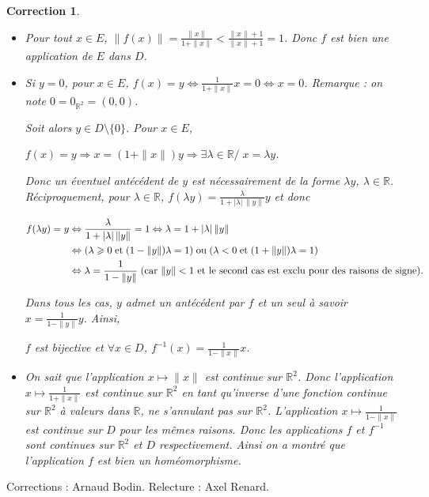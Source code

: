 \documentclass[11pt,a4paper]{article}
\newcommand{\Rr}{\mathbb{R}} \newcommand{\R}{\mathbb{R}}
\renewcommand{\ge}{\geqslant} \renewcommand{\geq}{\geqslant}
\theoremstyle{exostyle}
\newtheorem{cor}{Correction}
\newcommand{\correction}{\begin{cor}} \newcommand{\fincorrection}{\end{cor}}
\begin{document}
\correction
~
\begin{itemize}
  \item Pour tout $x\in E$, $\|f(x)\|= \frac{\|x\|}{1+\|x\|}< \frac{\|x\|+1}{\|x\|+1}=1$. Donc $f$ est bien une application de $E$ dans $D$.

  \item Si $y=0$, pour $x\in E$, $f(x)=y\Leftrightarrow \frac{1}{1+\|x\|}x=0\Leftrightarrow x=0$. Remarque : on note $0 = 0_{\Rr^2} = (0,0)$.

Soit alors $y\in D\setminus\{0\}$. Pour $x\in E$,

\begin{center}
	$f(x)=y\Rightarrow x=(1+\|x\|)y\Rightarrow\exists\lambda\in\Rr/\;x=\lambda y$.
\end{center}

Donc un éventuel antécédent de $y$ est nécessairement de la forme $\lambda y$, $\lambda\in\Rr$. Réciproquement, pour $\lambda\in\Rr$, $f(\lambda y)= \frac{\lambda}{1+|\lambda| \, \|y\|}y$ et donc

\begin{align*}\ensuremath
	f(\lambda y)=y&\Leftrightarrow \frac{\lambda}{1+|\lambda| \, \|y\|}=1\Leftrightarrow\lambda=1+|\lambda| \, \|y\|\\
	&\Leftrightarrow(\lambda\ge0\;\text{et}\;(1-\|y\|)\lambda=1)\;\text{ou}\;(\lambda<0\;\text{et}\;(1+\|y\|)\lambda=1)\\
	&\Leftrightarrow\lambda= \frac{1}{1-\|y\|}\;\text{(car $\|y\|<1$ et le second cas est exclu pour des raisons de signe)}.
\end{align*}

Dans tous les cas, $y$ admet un antécédent par $f$ et un seul à savoir $x= \frac{1}{1-\|y\|}y$. Ainsi,

\begin{center}
	$f$ est bijective et $\forall x\in D$, $f^{-1}(x)= \frac{1}{1-\|x\|}x$.
\end{center}

  \item On sait que l'application $x\mapsto\|x\|$ est continue sur $\Rr^2$. Donc l'application $x\mapsto \frac{1}{1+\|x\|}$ est continue sur $\Rr^2$ en tant qu'inverse d'une fonction continue sur $\Rr^2$ à valeurs dans $\Rr$, ne s'annulant pas sur $\Rr^2$. L'application $x\mapsto \frac{1}{1-\|x\|}$ est continue sur $D$ pour les mêmes raisons. Donc les applications $f$ et $f^{-1}$ sont continues sur $\Rr^2$ et $D$ respectivement. Ainsi on a montré que
l'application $f$ est bien un homéomorphisme.
\end{itemize}
\fincorrection
\finexercice


\bigskip

Corrections : Arnaud Bodin. Relecture : Axel Renard.
\end{document}

